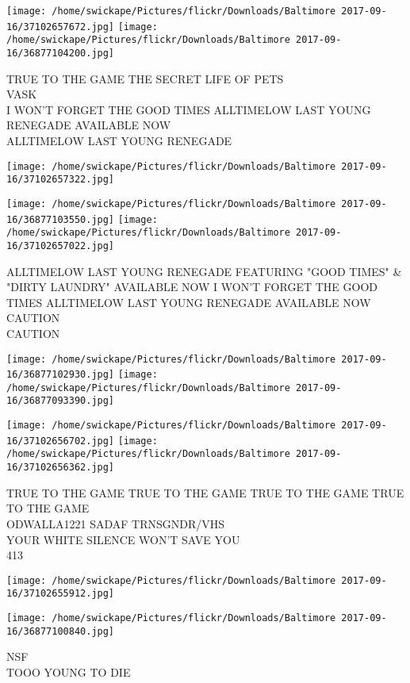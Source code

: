 \documentclass[10pt,letterpaper]{article}
\begin{document}
\texttt{[image: /home/swickape/Pictures/flickr/Downloads/Baltimore 2017-09-16/37102657672.jpg]}
\texttt{[image: /home/swickape/Pictures/flickr/Downloads/Baltimore 2017-09-16/36877104200.jpg]}

TRUE TO THE GAME THE SECRET LIFE OF PETS\\
VASK\\
I WON'T FORGET THE GOOD TIMES ALLTIMELOW LAST YOUNG RENEGADE AVAILABLE NOW\\
ALLTIMELOW LAST YOUNG RENEGADE
\pagebreak

\texttt{[image: /home/swickape/Pictures/flickr/Downloads/Baltimore 2017-09-16/37102657322.jpg]}

\vspace{0.25in}
\texttt{[image: /home/swickape/Pictures/flickr/Downloads/Baltimore 2017-09-16/36877103550.jpg]}
\texttt{[image: /home/swickape/Pictures/flickr/Downloads/Baltimore 2017-09-16/37102657022.jpg]}

ALLTIMELOW LAST YOUNG RENEGADE FEATURING "GOOD TIMES" \& "DIRTY LAUNDRY" AVAILABLE NOW I WON'T FORGET THE GOOD TIMES ALLTIMELOW LAST YOUNG RENEGADE AVAILABLE NOW\\
CAUTION\\
CAUTION
\pagebreak

\texttt{[image: /home/swickape/Pictures/flickr/Downloads/Baltimore 2017-09-16/36877102930.jpg]}
\texttt{[image: /home/swickape/Pictures/flickr/Downloads/Baltimore 2017-09-16/36877093390.jpg]}

\texttt{[image: /home/swickape/Pictures/flickr/Downloads/Baltimore 2017-09-16/37102656702.jpg]}
\texttt{[image: /home/swickape/Pictures/flickr/Downloads/Baltimore 2017-09-16/37102656362.jpg]}

TRUE TO THE GAME TRUE TO THE GAME TRUE TO THE GAME TRUE TO THE GAME\\
ODWALLA1221 SADAF TRNSGNDR/VHS\\
YOUR WHITE SILENCE WON'T SAVE YOU\\
413
\pagebreak

\texttt{[image: /home/swickape/Pictures/flickr/Downloads/Baltimore 2017-09-16/37102655912.jpg]}

\vspace{0.25in}
\texttt{[image: /home/swickape/Pictures/flickr/Downloads/Baltimore 2017-09-16/36877100840.jpg]}

NSF\\
TOOO YOUNG TO DIE
\pagebreak
\end{document}
